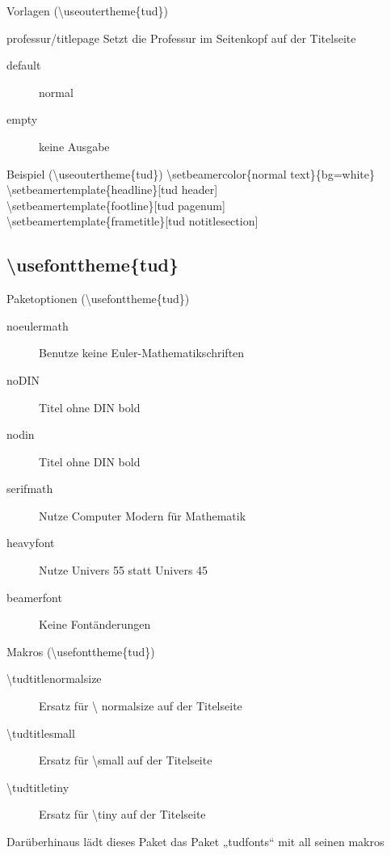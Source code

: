 \documentclass[presentation,t]{beamer}
\begin{document}
\begin{frame}[allowframebreaks,label=sec-2-2-4]{Vorlagen (\textbackslash useoutertheme\{tud\})}
\begin{block}{professur/titlepage}
Setzt die Professur im Seitenkopf auf der Titelseite

\begin{description}
\item[{default}] normal
\item[{empty}] keine Ausgabe
\end{description}
\end{block}
\end{frame}

\begin{frame}[label=sec-2-2-5]{Beispiel (\textbackslash useoutertheme\{tud\})}
\textbackslash setbeamercolor\{normal text\}\{bg=white\}\\
\textbackslash setbeamertemplate\{headline\}[tud header]\\
\textbackslash setbeamertemplate\{footline\}[tud pagenum]\\
\textbackslash setbeamertemplate\{frametitle\}[tud notitlesection]\\
\end{frame}


\subsection{\textbackslash usefonttheme\{tud\}}
\label{sec-2-3}

\begin{frame}[label=sec-2-3-1]{Paketoptionen (\textbackslash usefonttheme\{tud\})}
\begin{description}
\item[{noeulermath}] Benutze keine Euler-Mathematikschriften
\item[{noDIN}] Titel ohne DIN bold
\item[{nodin}] Titel ohne DIN bold
\item[{serifmath}] Nutze Computer Modern für Mathematik
\item[{heavyfont}] Nutze Univers 55 statt Univers 45
\item[{beamerfont}] Keine Fontänderungen
\end{description}
\end{frame}

\begin{frame}[label=sec-2-3-2]{Makros (\textbackslash usefonttheme\{tud\})}
\begin{description}
\item[{\textbackslash tudtitlenormalsize}] Ersatz für \textbackslash
  normalsize auf der Titelseite
\item[{\textbackslash tudtitlesmall}] Ersatz für \textbackslash small auf der Titelseite
\item[{\textbackslash tudtitletiny}] Ersatz für \textbackslash tiny auf der Titelseite
\end{description}

Darüberhinaus lädt dieses Paket das Paket „tudfonts“ mit all seinen makros
\end{frame}
\end{document}
